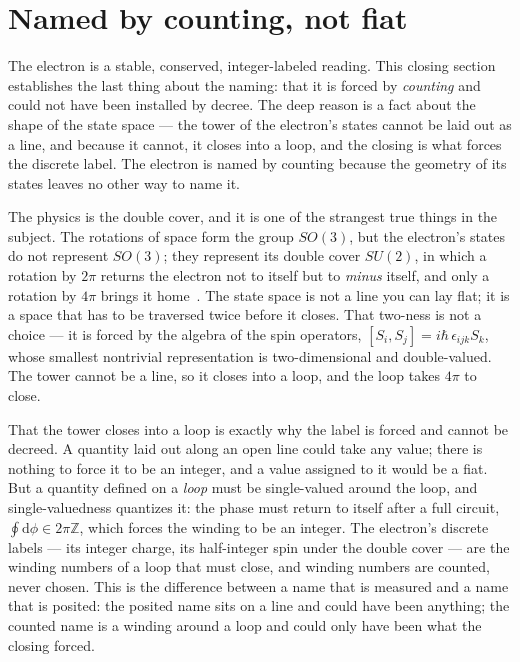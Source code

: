 \section{Named by counting, not fiat}

The electron is a stable, conserved, integer-labeled reading. This closing section establishes the last thing about the
naming: that it is forced by \emph{counting} and could not have been installed by decree. The deep reason is a fact about the
shape of the state space --- the tower of the electron's states cannot be laid out as a line, and because it cannot, it
closes into a loop, and the closing is what forces the discrete label. The electron is named by counting because the
geometry of its states leaves no other way to name it.

The physics is the double cover, and it is one of the strangest true things in the subject. The rotations of space form the
group $SO(3)$, but the electron's states do not represent $SO(3)$; they represent its double cover $SU(2)$, in which a
rotation by $2\pi$ returns the electron not to itself but to \emph{minus} itself, and only a rotation by $4\pi$ brings it
home~\cite{pauli1927,dirac1928}. The state space is not a line you can lay flat; it is a space that has to be traversed twice
before it closes. That two-ness is not a choice --- it is forced by the algebra of the spin operators, $[S_i, S_j] =
i\hbar\,\epsilon_{ijk} S_k$, whose smallest nontrivial representation is two-dimensional and double-valued. The tower cannot
be a line, so it closes into a loop, and the loop takes $4\pi$ to close.

That the tower closes into a loop is exactly why the label is forced and cannot be decreed. A quantity laid out along an open
line could take any value; there is nothing to force it to be an integer, and a value assigned to it would be a fiat. But a
quantity defined on a \emph{loop} must be single-valued around the loop, and single-valuedness quantizes it: the phase must
return to itself after a full circuit, $\oint \mathrm{d}\phi \in 2\pi\mathbb{Z}$, which forces the winding to be an integer.
The electron's discrete labels --- its integer charge, its half-integer spin under the double cover --- are the winding
numbers of a loop that must close, and winding numbers are counted, never chosen. This is the difference between a name that
is measured and a name that is posited: the posited name sits on a line and could have been anything; the counted name is a
winding around a loop and could only have been what the closing forced.

